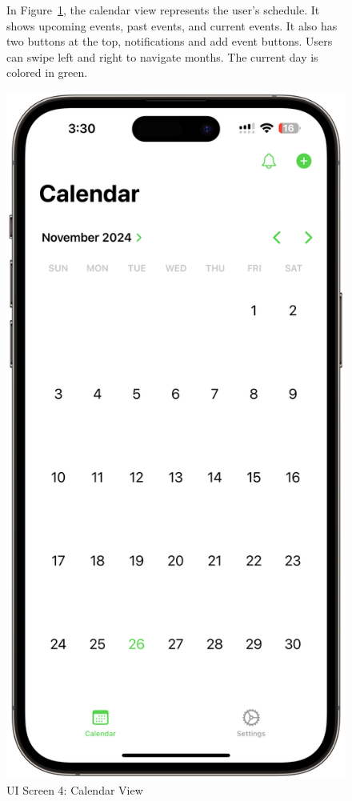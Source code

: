 \begin{figure}[!h]
    \begin{minipage}{0.65\textwidth}
        In Figure~\ref{fig:ui-screen-4}, the calendar view represents the user's schedule. It shows upcoming events, past events, and current events. It also has two buttons at the top, notifications and add event buttons. Users can swipe left and right to navigate months. The current day is colored in green.
    \end{minipage}
    \hfill
    \begin{minipage}{0.3\textwidth}
        \centering
        \includegraphics[width=\textwidth]{images/screen4.png}
        \caption{UI Screen 4: Calendar View}
        \label{fig:ui-screen-4}
    \end{minipage}
\end{figure}

